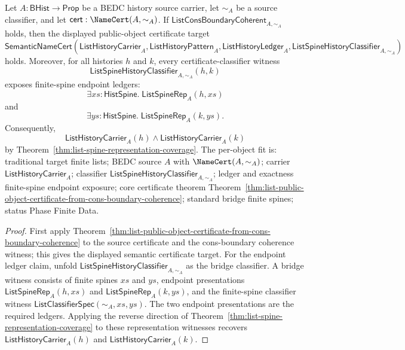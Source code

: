 \begin{theorem}
\label{thm:list-public-object-endpoint-spine-ledgers}
Let $A:\mathsf{BHist}\to\mathsf{Prop}$ be a BEDC history source carrier, let
$\sim_A$ be a source classifier, and let
$\mathsf{cert}:\NameCert(A,\sim_A)$. If
$\mathsf{ListConsBoundaryCoherent}_{A,\sim_A}$ holds, then the displayed
public-object certificate target
$$
\mathsf{SemanticNameCert}(\mathsf{ListHistoryCarrier}_A,
\mathsf{ListHistoryPattern}_A,
\mathsf{ListHistoryLedger}_A,
\mathsf{ListSpineHistoryClassifier}_{A,\sim_A})
$$
holds. Moreover, for all histories $h$ and $k$, every certificate-classifier
witness
$$
\mathsf{ListSpineHistoryClassifier}_{A,\sim_A}(h,k)
$$
exposes finite-spine endpoint ledgers:
$$
\exists xs:\mathsf{HistSpine}.\;\mathsf{ListSpineRep}_A(h,xs)
$$
and
$$
\exists ys:\mathsf{HistSpine}.\;\mathsf{ListSpineRep}_A(k,ys).
$$
Consequently,
$$
\mathsf{ListHistoryCarrier}_A(h)\land\mathsf{ListHistoryCarrier}_A(k)
$$
by Theorem~\ref{thm:list-spine-representation-coverage}. The per-object fit is:
traditional target finite lists; BEDC source $A$ with
$\NameCert(A,\sim_A)$; carrier $\mathsf{ListHistoryCarrier}_A$; classifier
$\mathsf{ListSpineHistoryClassifier}_{A,\sim_A}$; ledger and exactness
finite-spine endpoint exposure; core certificate theorem
Theorem~\ref{thm:list-public-object-certificate-from-cons-boundary-coherence};
standard bridge finite spines; status Phase Finite Data.
\end{theorem}
\begin{proof}
First apply
Theorem~\ref{thm:list-public-object-certificate-from-cons-boundary-coherence}
to the source certificate and the cons-boundary coherence witness; this gives
the displayed semantic certificate target. For the endpoint ledger claim, unfold
$\mathsf{ListSpineHistoryClassifier}_{A,\sim_A}$ as the bridge classifier. A
bridge witness consists of finite spines $xs$ and $ys$, endpoint presentations
$\mathsf{ListSpineRep}_A(h,xs)$ and $\mathsf{ListSpineRep}_A(k,ys)$, and the
finite-spine classifier witness $\mathsf{ListClassifierSpec}(\sim_A,xs,ys)$.
The two endpoint presentations are the required ledgers. Applying the reverse
direction of Theorem~\ref{thm:list-spine-representation-coverage} to these
representation witnesses recovers
$\mathsf{ListHistoryCarrier}_A(h)$ and $\mathsf{ListHistoryCarrier}_A(k)$.
\end{proof}

